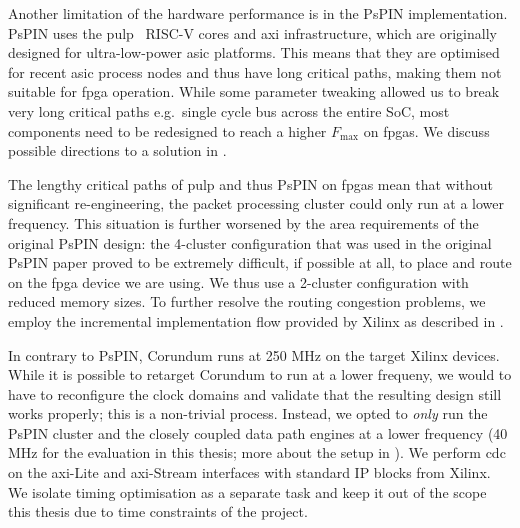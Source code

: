 Another limitation of the hardware performance is in the PsPIN implementation.  PsPIN uses the \ac{pulp}~\cite{rossi_pulp_2015} RISC-V cores and \ac{axi} infrastructure, which are originally designed for ultra-low-power \ac{asic} platforms.  This means that they are optimised for recent \ac{asic} process nodes and thus have long critical paths, making them not suitable for \ac{fpga} operation.  While some parameter tweaking allowed us to break very long critical paths e.g.\ single cycle bus across the entire SoC, most components need to be redesigned to reach a higher $F_{\text{max}}$ on \ac{fpga}s.  We discuss possible directions to a solution in .

The lengthy critical paths of \ac{pulp} and thus PsPIN on \ac{fpga}s mean that without significant re-engineering, the packet processing cluster could only run at a lower frequency.  This situation is further worsened by the area requirements of the original PsPIN design: the 4-cluster configuration that was used in the original PsPIN paper proved to be extremely difficult, if possible at all, to place and route on the \ac{fpga} device we are using.  We thus use a 2-cluster configuration with reduced memory sizes.  To further resolve the routing congestion problems, we employ the incremental implementation flow provided by Xilinx as described in .

In contrary to PsPIN, Corundum runs at 250 MHz on the target Xilinx devices.  While it is possible to retarget Corundum to run at a lower frequeny, we would to have to reconfigure the clock domains and validate that the resulting design still works properly; this is a non-trivial process.  Instead, we opted to \emph{only} run the PsPIN cluster and the closely coupled data path engines at a lower frequency (40 MHz for the evaluation in this thesis; more about the setup in ).  We perform \ac{cdc} on the \ac{axi}-Lite and \ac{axi}-Stream interfaces with standard IP blocks from Xilinx.  We isolate timing optimisation as a separate task and keep it out of the scope this thesis due to time constraints of the project.
